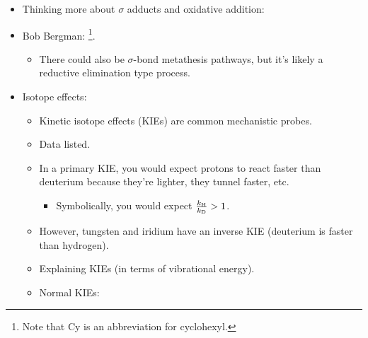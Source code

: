 \documentclass[../notes.tex]{subfiles}
\begin{document}
\begin{itemize}
\begin{itemize}
\begin{itemize}
        \end{itemize}
    \end{itemize}
    \item Thinking more about $\sigma$ adducts and oxidative addition:
    \item Bob Bergman: \footnote{Note that Cy is an abbreviation for cyclohexyl.}.
    \begin{itemize}
        \item There could also be $\sigma$-bond metathesis pathways, but it's likely a reductive elimination type process.
    \end{itemize}
    \item Isotope effects:
    \begin{itemize}
        \item Kinetic isotope effects (KIEs) are common mechanistic probes.
        \item Data listed.
        \item In a primary KIE, you would expect protons to react faster than deuterium because they're lighter, they tunnel faster, etc.
        \begin{itemize}
            \item Symbolically, you would expect $\frac{k_{\ce{H}}}{k_{\ce{D}}}>1$.
        \end{itemize}
        \item However, tungsten and iridium have an inverse KIE (deuterium is faster than hydrogen).
        \item Explaining KIEs (in terms of vibrational energy).
        \item Normal KIEs:
        \begin{figure}[h!]
            \centering
            \begin{subfigure}[b]{0.45\linewidth}
                \centering
\end{subfigure}
\end{figure}
\end{itemize}
\end{itemize}
\end{document}
